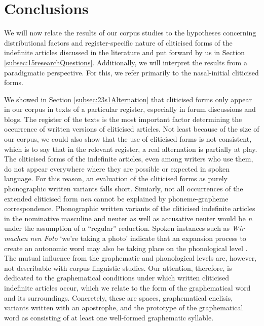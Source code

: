 \section{Conclusions}
\label{sec:3conclusions}

We will now relate the results of our corpus studies to the hypotheses concerning distributional factors and register-specific nature of cliticised forms of the indefinite articles discussed in the literature and put forward by us in Section \ref{subsec:15researchQuestions}.
Additionally, we will interpret the results from a paradigmatic perspective.
For this, we refer primarily to the nasal-initial cliticised forms.

We showed in Section \ref{subsec:23s1Alternation} that cliticised forms only appear in our corpus in texts of a particular register, especially in forum discussions and blogs.
The register of the texts is the most important factor determining the occurrence of written versions of cliticised articles.
Not least because of the size of our corpus, we could also show that the use of cliticised forms is not consistent, which is to say that in the relevant register, a real alternation is partially at play.
The cliticised forms of the indefinite articles, even among writers who use them, do not appear everywhere where they are possible or expected in spoken language.
For this reason, an evaluation of the cliticised forms as purely phonographic written variants falls short.
Simiarly, not all occurrences of the extended cliticised form \textit{nen} cannot be explained by phoneme-grapheme correspondence.
Phonographic written variants of the cliticised indefinite articles in the nominative masculine and neuter as well as accusative neuter would be \textit{n} under the assumption of a ``regular'' reduction.
Spoken instances such as \textit{Wir machen nen Foto} `we're taking a photo' indicate that an expansion process to create an autonomic word may also be taking place on the phonological level \citep{Vogel2006}.
The mutual influence from the graphematic and phonological levels are, however, not describable with corpus linguistic studies.
Our attention, therefore, is dedicated to the graphematical conditions under which written cliticised indefinite articles occur, which we relate to the form of the graphematical word and its surroundings.
Concretely, these are spaces, graphematical enclisis, variants written with an apostrophe, and the prototype of the graphematical word as consisting of at least one well-formed graphematic syllable.

